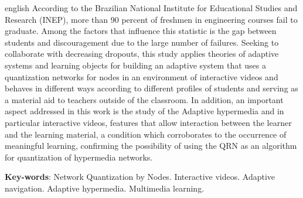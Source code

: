 \begin{resumo}[Abstract]
 \begin{otherlanguage*}{english}
According to the Brazilian National Institute for Educational Studies and Research (INEP), more than 90 percent of freshmen in engineering courses fail to graduate. Among the factors that influence this statistic is the gap between students and discouragement due to the large number of failures. Seeking to collaborate with decreasing dropouts, this study applies theories of adaptive systems and learning objects for building an adaptive system that uses a quantization networks for nodes in an environment of interactive videos and behaves in different ways according to different profiles of students and serving as a material aid to teachers outside of the classroom. In addition, an important aspect addressed in this work is the study of the Adaptive hypermedia and in particular interactive videos, features that allow interaction between the learner and the learning material, a condition which corroborates to the occurrence of meaningful learning, confirming the possibility of using the QRN as an algorithm for quantization of hypermedia networks.

   \vspace{\onelineskip}
 
   \noindent 
   \textbf{Key-words}: Network Quantization by Nodes. Interactive videos. Adaptive navigation. Adaptive hypermedia. Multimedia learning.
 \end{otherlanguage*}
\end{resumo}
